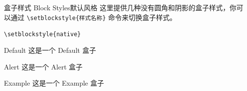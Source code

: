 \documentclass[10pt,aspectratio=169,fontset=none]{ctexbeamer}
\begin{document}
    \begin{frame}{盒子样式 Block Styles}{默认风格}
        这里提供几种没有圆角和阴影的盒子样式，你可以通过 \texttt{\textcolor{primary}{\textbackslash setblockstyle}\{样式名称\}} 命令来切换盒子样式。

        \begin{center}
            \texttt{\textcolor{primary}{\textbackslash setblockstyle}\{native\}}
        \end{center}

        \centering
        \begin{minipage}[b]{0.28\textwidth}
            \begin{block}{Default}
                这是一个 Default 盒子
            \end{block}    
        \end{minipage}
        \hspace*{1em}
        \begin{minipage}[b]{0.28\textwidth}
            \begin{alertblock}{Alert}
                这是一个 Alert 盒子
            \end{alertblock}      
        \end{minipage}
        \hspace*{1em}
        \begin{minipage}[b]{0.28\textwidth}
            \begin{exampleblock}{Example}
                这是一个 Example 盒子
            \end{exampleblock}       
        \end{minipage}

    \end{frame}
\end{document}

